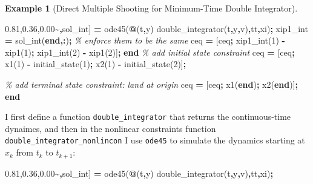 \documentclass[
]{book}
\newenvironment{Shaded}{\begin{snugshade}}{\end{snugshade}}
\newcommand{\CommentTok}[1]{\textcolor[rgb]{0.56,0.35,0.01}{\textit{#1}}}
\newcommand{\FloatTok}[1]{\textcolor[rgb]{0.00,0.00,0.81}{#1}}
\newcommand{\KeywordTok}[1]{\textcolor[rgb]{0.13,0.29,0.53}{\textbf{#1}}}
\newcommand{\NormalTok}[1]{#1}
\newcommand{\OperatorTok}[1]{\textcolor[rgb]{0.81,0.36,0.00}{\textbf{#1}}}
\newcommand{\VariableTok}[1]{\textcolor[rgb]{0.00,0.00,0.00}{#1}}
\theoremstyle{definition}
\theoremstyle{definition}
\newtheorem{example}{Example}[chapter]
\theoremstyle{definition}
\theoremstyle{definition}
\theoremstyle{remark}
\begin{document}
\begin{example}[Direct Multiple Shooting for Minimum-Time Double Integrator]
\begin{Shaded}
\begin{Highlighting}[]
\NormalTok{    [}\OperatorTok{\textasciitilde{},}\VariableTok{sol\_int}\NormalTok{] }\OperatorTok{=} \VariableTok{ode45}\NormalTok{(}\OperatorTok{@}\NormalTok{(}\VariableTok{t}\OperatorTok{,}\VariableTok{y}\NormalTok{) }\VariableTok{double\_integrator}\NormalTok{(}\VariableTok{t}\OperatorTok{,}\VariableTok{y}\OperatorTok{,}\VariableTok{v}\NormalTok{)}\OperatorTok{,}\VariableTok{tt}\OperatorTok{,}\VariableTok{xi}\NormalTok{)}\OperatorTok{;}
    \VariableTok{xip1\_int} \OperatorTok{=} \VariableTok{sol\_int}\NormalTok{(}\KeywordTok{end}\OperatorTok{,:}\NormalTok{)}\OperatorTok{;}
    \CommentTok{\% enforce them to be the same}
    \VariableTok{ceq} \OperatorTok{=}\NormalTok{ [}\VariableTok{ceq}\OperatorTok{;}
           \VariableTok{xip1\_int}\NormalTok{(}\FloatTok{1}\NormalTok{) }\OperatorTok{{-}} \VariableTok{xip1}\NormalTok{(}\FloatTok{1}\NormalTok{)}\OperatorTok{;}
           \VariableTok{xip1\_int}\NormalTok{(}\FloatTok{2}\NormalTok{) }\OperatorTok{{-}} \VariableTok{xip1}\NormalTok{(}\FloatTok{2}\NormalTok{)]}\OperatorTok{;}
\KeywordTok{end}
\CommentTok{\% add initial state constraint}
\VariableTok{ceq} \OperatorTok{=}\NormalTok{ [}\VariableTok{ceq}\OperatorTok{;}
       \VariableTok{x1}\NormalTok{(}\FloatTok{1}\NormalTok{) }\OperatorTok{{-}} \VariableTok{initial\_state}\NormalTok{(}\FloatTok{1}\NormalTok{)}\OperatorTok{;}
       \VariableTok{x2}\NormalTok{(}\FloatTok{1}\NormalTok{) }\OperatorTok{{-}} \VariableTok{initial\_state}\NormalTok{(}\FloatTok{2}\NormalTok{)]}\OperatorTok{;}

\CommentTok{\% add terminal state constraint: land at origin}
\VariableTok{ceq} \OperatorTok{=}\NormalTok{ [}\VariableTok{ceq}\OperatorTok{;}
       \VariableTok{x1}\NormalTok{(}\KeywordTok{end}\NormalTok{)}\OperatorTok{;}
       \VariableTok{x2}\NormalTok{(}\KeywordTok{end}\NormalTok{)]}\OperatorTok{;} 
\KeywordTok{end}
\end{Highlighting}
\end{Shaded}

I first define a function \texttt{double\_integrator} that returns the continuous-time dynaimcs, and then in the nonlinear constraints function \texttt{double\_integrator\_nonlincon} I use \texttt{ode45} to simulate the dynamics starting at \(x_k\) from \(t_k\) to \(t_{k+1}\):

\begin{Shaded}
\begin{Highlighting}[]
\NormalTok{[}\OperatorTok{\textasciitilde{},}\VariableTok{sol\_int}\NormalTok{] }\OperatorTok{=} \VariableTok{ode45}\NormalTok{(}\OperatorTok{@}\NormalTok{(}\VariableTok{t}\OperatorTok{,}\VariableTok{y}\NormalTok{) }\VariableTok{double\_integrator}\NormalTok{(}\VariableTok{t}\OperatorTok{,}\VariableTok{y}\OperatorTok{,}\VariableTok{v}\NormalTok{)}\OperatorTok{,}\VariableTok{tt}\OperatorTok{,}\VariableTok{xi}\NormalTok{)}\OperatorTok{;}
\end{Highlighting}
\end{Shaded}


\end{example}
\end{document}
